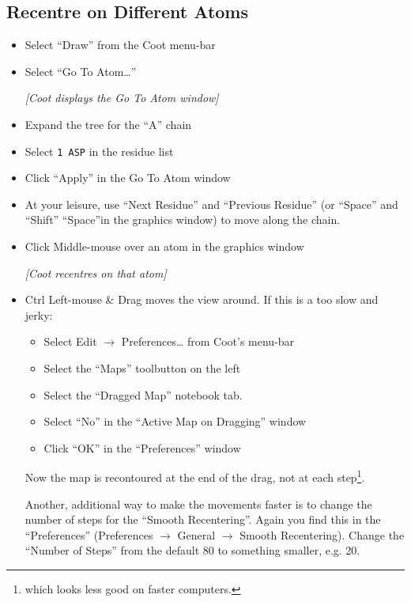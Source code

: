 \documentclass{article}
\begin{document}
\subsection {Recentre on Different Atoms}
\begin{itemize}
\item Select \textsf{``Draw''} from the Coot menu-bar
\item Select \textsf{``Go To Atom\ldots''}

\textsl{  [Coot displays the Go To Atom window]}

\item Expand the tree for the ``A'' chain
\item Select \texttt{1 ASP} in the residue list
\item Click \textsf{``Apply''} in the Go To Atom window
  
\item At your leisure, use \textsf{``Next Residue''} and
  \textsf{``Previous Residue''} (or ``Space'' and ``Shift''
  ``Space''in the graphics window) to move along the chain.


\item Click Middle-mouse over an atom in the graphics window

\textsl{[Coot recentres on that atom]}

\item Ctrl Left-mouse \& Drag moves the view around.  If this is a too
  slow and jerky:
  \begin{itemize}
  \item Select \textsf{Edit $\rightarrow$ Preferences\ldots} from Coot's menu-bar
  \item Select the \textsf{``Maps''} toolbutton on the left
  \item Select the \textsf{``Dragged Map''} notebook tab.
  \item Select \textsf{``No''} in the ``Active Map on Dragging'' window
  \item Click \textsf{``OK''} in the ``Preferences'' window
  \end{itemize}
  Now the map is recontoured at the end of the drag, not at each
  step\footnote{which looks less good on faster computers.}.

  Another, additional way to make the movements faster is to change the 
  number of steps for the ``Smooth Recentering''. Again you find this in
  the ``Preferences'' (\textsf{Preferences $\rightarrow$ General $\rightarrow$ 
  Smooth Recentering}). Change the \textsf{``Number of Steps''} from the 
  default 80 to something smaller, e.g. 20.



\end{itemize}
\end{document}
